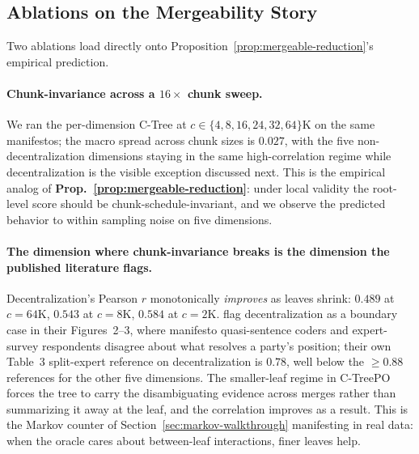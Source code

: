 \subsection{Ablations on the Mergeability Story}

Two ablations load directly onto Proposition~\ref{prop:mergeable-reduction}'s
empirical prediction.

\paragraph{Chunk-invariance across a $16\times$ chunk sweep.} We ran
the per-dimension C-Tree at $c\in\{4,8,16,24,32,64\}\mathrm{K}$ on the
same manifestos; the macro spread across chunk sizes is $0.027$, with
the five non-decentralization dimensions staying in the same
high-correlation regime while decentralization is the visible exception
discussed next. This is the empirical
analog of \textbf{Prop.~\ref{prop:mergeable-reduction}}: under local
validity the root-level score should be chunk-schedule-invariant, and
we observe the predicted behavior to within sampling noise on five
dimensions.

\paragraph{The dimension where chunk-invariance breaks is the
dimension the published literature flags.} Decentralization's
Pearson $r$ monotonically \emph{improves} as leaves shrink: $0.489$
at $c = 64\mathrm{K}$, $0.543$ at $c = 8\mathrm{K}$, $0.584$ at
$c = 2\mathrm{K}$. \citet{BenoitEtAl2025} flag decentralization as a
boundary case in their Figures~2--3, where manifesto quasi-sentence
coders and expert-survey respondents disagree about what
          resolves a party's position; their own Table~3 split-expert
          reference on decentralization is $0.78$, well below the
          $\ge 0.88$ references for the other five dimensions. The smaller-leaf regime in
C-TreePO forces the tree to carry the disambiguating evidence across
merges rather than summarizing it away at the leaf, and the
correlation improves as a result. This is the Markov counter of
Section~\ref{sec:markov-walkthrough} manifesting in real data: when
the oracle cares about between-leaf interactions, finer leaves help.

